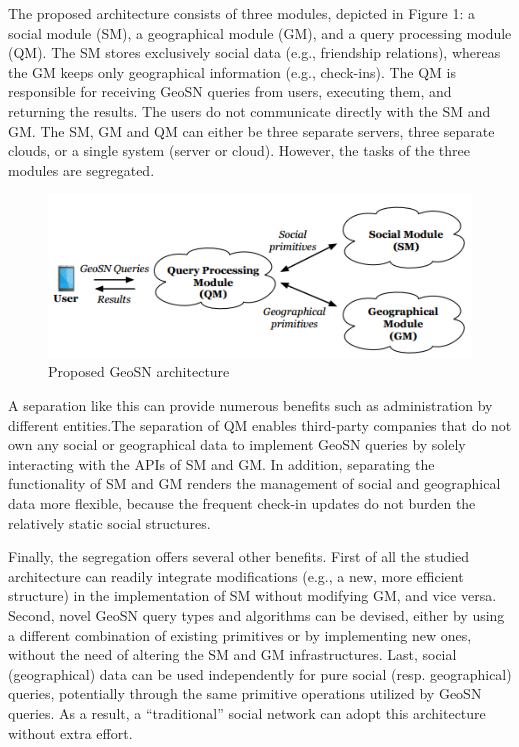 \documentclass[prodmode,acmtods]{acmsmall} %
\begin{document}
The proposed architecture consists of three modules, depicted in
Figure 1: a social module (SM), a geographical module (GM), and
a query processing module (QM). The SM stores exclusively social
data (e.g., friendship relations), whereas the GM keeps only
geographical information (e.g., check-ins). The QM is responsible
for receiving GeoSN queries from users, executing them, and returning
the results. The users do not communicate directly with the
SM and GM. The SM, GM and QM can either be three separate
servers, three separate clouds, or a single system (server or cloud).
However, the tasks of the three modules are segregated.

\begin{figure}[h]
\centering
\includegraphics[width=0.7\linewidth]{./graphics/geoSNArchitecture}
\caption{Proposed GeoSN architecture}
\label{fig:geoSNArchitecture}
\end{figure}

A separation like this can provide numerous benefits such as administration by
different entities.The separation of QM enables third-party companies that do not own
any social or geographical data to implement GeoSN queries by
solely interacting with the APIs of SM and GM. In addition, separating the functionality of SM and GM renders
the management of social and geographical data more flexible, because
the frequent check-in updates do not burden the relatively
static social structures.

Finally, the segregation offers several other benefits. First of all the studied
architecture can readily integrate modifications (e.g., a new, more
efficient structure) in the implementation of SM without modifying
GM, and vice versa. Second, novel GeoSN query types and
algorithms can be devised, either by using a different combination
of existing primitives or by implementing new ones, without the
need of altering the SM and GM infrastructures. Last, social (geographical)
data can be used independently for pure social (resp.
geographical) queries, potentially through the same primitive operations
utilized by GeoSN queries. As a result, a “traditional” social
network can adopt this architecture without extra effort.
\end{document}
